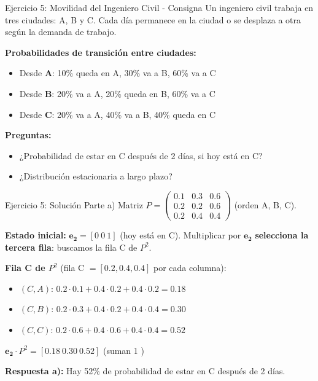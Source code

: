 \documentclass{beamer}
\begin{document}
\begin{frame}{Ejercicio 5: Movilidad del Ingeniero Civil - Consigna}
    \small
    Un ingeniero civil trabaja en tres ciudades: A, B y C. Cada día permanece en la ciudad o se desplaza a otra según la demanda de trabajo.

    \vspace{0.5em}

    \textbf{Probabilidades de transición entre ciudades:}
    \begin{itemize}
        \item Desde \textbf{A}: 10\% queda en A, 30\% va a B, 60\% va a C
        \item Desde \textbf{B}: 20\% va a A, 20\% queda en B, 60\% va a C
        \item Desde \textbf{C}: 20\% va a A, 40\% va a B, 40\% queda en C
    \end{itemize}

    \vspace{0.5em}

    \textbf{Preguntas:}
    \begin{itemize}
        \item[a)] ¿Probabilidad de estar en C después de 2 días, si hoy está en C?
        \item[b)] ¿Distribución estacionaria a largo plazo?
    \end{itemize}
\end{frame}

\begin{frame}{Ejercicio 5: Solución Parte a)}
    \small
    Matriz $P = \begin{pmatrix} 0.1 & 0.3 & 0.6 \\ 0.2 & 0.2 & 0.6 \\ 0.2 & 0.4 & 0.4 \end{pmatrix}$ (orden A, B, C).

    \vspace{0.4em}

    \textbf{Estado inicial:} $\mathbf{e_2} = [0\ 0\ 1]$ (hoy está en C). Multiplicar por $\mathbf{e_2}$ \textbf{selecciona la tercera fila}: buscamos la fila C de $P^2$.

    \vspace{0.4em}

    \textbf{Fila C de $P^2$} (fila C $= [0.2, 0.4, 0.4]$ por cada columna):
    \begin{itemize}
        \item $(C,A)$: $0.2 \cdot 0.1 + 0.4 \cdot 0.2 + 0.4 \cdot 0.2 = 0.18$
        \item $(C,B)$: $0.2 \cdot 0.3 + 0.4 \cdot 0.2 + 0.4 \cdot 0.4 = 0.30$
        \item $(C,C)$: $0.2 \cdot 0.6 + 0.4 \cdot 0.6 + 0.4 \cdot 0.4 = 0.52$
    \end{itemize}

    \vspace{0.3em}

    $\mathbf{e_2} \cdot P^2 = [0.18\ 0.30\ \boxed{0.52}]$ \quad (suman 1 \checkmark)

    \textbf{Respuesta a):} Hay 52\% de probabilidad de estar en C después de 2 días.
\end{frame}
\end{document}
